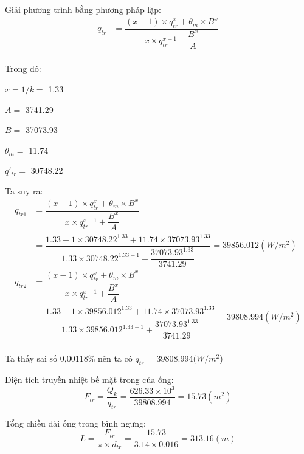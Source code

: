 Giải phương trình bằng phương pháp lặp:
\begin{equation*}
	\begin{split}
		q_{tr} &= \dfrac{(x - 1)\times q_{tr}^{x} + \theta_{m}\times B^{x}}{x\times q_{tr}^{x-1} + \dfrac{B^{x}}{A}}\\
	\end{split}
\end{equation*}

Trong đó:
\begin{itemize}
\begin{multicols}{3}
	\item $x = 1/k = $ 1.33
	\item $A = $ 3741.29
	\item $B = $ 37073.93
	\item $\theta_{m} = $ 11.74
	\item $q'_{tr} = $ 30748.22
\end{multicols}
\end{itemize}

Ta suy ra:
\begin{equation*}
	\begin{split}
	q_{tr1} &= \dfrac{(x - 1)\times q_{tr}^{x} + \theta_{m}\times B^{x}}{x\times q_{tr}^{x-1} + \dfrac{B^{x}}{A}}\\
	& = \dfrac{1.33-1 \times 30748.22^{1.33} + 11.74 \times 37073.93^{1.33}}{1.33 \times 30748.22^{1.33-1}+\dfrac{37073.93^{1.33}}{3741.29}}=39856.012(W/m^2)\\
	q_{tr2} &= \dfrac{(x - 1)\times q_{tr}^{x} + \theta_{m}\times B^{x}}{x\times q_{tr}^{x-1} + \dfrac{B^{x}}{A}}\\
	& = \dfrac{1.33-1 \times 39856.012^{1.33} + 11.74 \times 37073.93^{1.33}}{1.33 \times 39856.012^{1.33-1}+\dfrac{37073.93^{1.33}}{3741.29}}=39808.994(W/m^2)\\
	\end{split}
\end{equation*}

Ta thấy sai số 0,00118\% nên ta có $q_{tr}$ = 39808.994$(W/m^2$)

Diện tích truyền nhiệt bề mặt trong của ống:
\begin{equation*}
	F_{tr} = \dfrac{Q_{k}}{q_{tr}} = \dfrac{626.33 \times 10^3}{39808.994}=15.73(m^2)
\end{equation*}

Tổng chiều dài ống trong bình ngưng:
\begin{equation*}
	L = \dfrac{F_{tr}}{\pi\times d_{tr}} = \dfrac{15.73}{3.14 \times 0.016}= 313.16(m)
\end{equation*}

